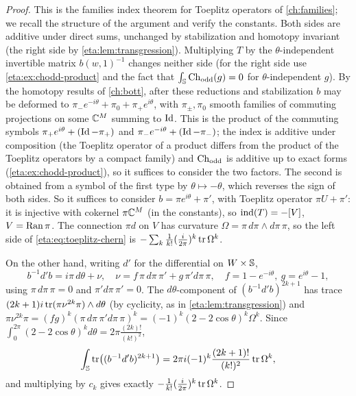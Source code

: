 \begin{proof} This is the families index theorem for Toeplitz operators of
\cref{ch:families}; we recall the structure of the argument and verify the
constants. Both sides are additive under direct sums, unchanged by stabilization and
homotopy invariant (the right side by \cref{eta:lem:transgression}). Multiplying
$T$ by the $\theta$-independent invertible matrix $b(w,1)^{-1}$ changes neither side
(for the right side use \cref{eta:ex:chodd-product} and the fact that
$\int_{\mathbb{S}}\operatorname{Ch}_{\mathrm{odd}}(g)=0$ for $\theta$-independent $g$). By the homotopy results of
\cref{ch:bott}, after these reductions and stabilization $b$ may be deformed to
$\pi_-e^{-i\theta}+\pi_0+\pi_+e^{i\theta}$, with $\pi_\pm,\pi_0$ smooth families of
commuting projections on some $\mathbb{C}^M$ summing to $\operatorname{Id}$. This is the product of the
commuting symbols $\pi_+e^{i\theta}+(\operatorname{Id}-\pi_+)$ and $\pi_-e^{-i\theta}+(\operatorname{Id}-\pi_-)$;
the index is additive under composition (the Toeplitz operator of a product differs
from the product of the Toeplitz operators by a compact family) and $\operatorname{Ch}_{\mathrm{odd}}$ is additive
up to exact forms (\cref{eta:ex:chodd-product}), so it suffices to consider the two
factors. The second is obtained from a symbol of the first type by $\theta\mapsto-\theta$,
which reverses the sign of both sides. So it suffices to consider $b=\pi e^{i\theta}+\pi'$, with
Toeplitz operator $\pi U+\pi'$: it is injective with cokernel $\pi\mathbb{C}^M$ (in the
constants), so $\operatorname{ind}(T)=-[V]$, $V=\operatorname{Ran}\pi$. The connection $\pi d$ on $V$ has
curvature $\Omega=\pi\,d\pi\wedge d\pi\,\pi$, so the left side of
\eqref{eta:eq:toeplitz-chern} is $-\sum_k\frac1{k!}(\frac i{2\pi})^k\operatorname{tr}\Omega^k$.

On the other hand, writing $d'$ for the differential on $W\times\mathbb{S}$,
\[
b^{-1}d'b=i\pi\,d\theta+\nu,\quad \nu=f\,\pi\,d\pi\,\pi'+g\,\pi'd\pi\,\pi,\quad
f=1-e^{-i\theta},\ g=e^{i\theta}-1,
\]
using $\pi\,d\pi\,\pi=0$ and $\pi'd\pi\,\pi'=0$. The $d\theta$-component of
$(b^{-1}d'b)^{2k+1}$ has trace $(2k+1)i\operatorname{tr}(\pi\nu^{2k}\pi)\wedge d\theta$ (by
cyclicity, as in \cref{eta:lem:transgression}) and $\pi\nu^{2k}\pi=(fg)^k
(\pi\,d\pi\,\pi'd\pi\,\pi)^k=(-1)^k(2-2\cos\theta)^k\Omega^k$. Since
$\int_0^{2\pi}(2-2\cos\theta)^kd\theta=2\pi\frac{(2k)!}{(k!)^2}$,
\[
\int_{\mathbb{S}}\operatorname{tr}\bigl((b^{-1}d'b)^{2k+1}\bigr)=2\pi i(-1)^k\frac{(2k+1)!}{(k!)^2}\operatorname{tr}\Omega^k,
\]
and multiplying by $c_k$ gives exactly $-\frac1{k!}(\frac i{2\pi})^k\operatorname{tr}\Omega^k$.
\end{proof}

